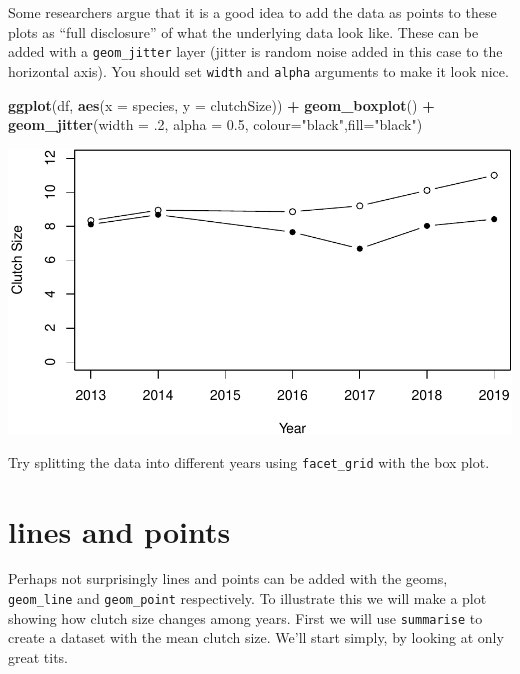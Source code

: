 \documentclass[
  a4paperpaper,
]{book}
\newenvironment{Shaded}{\begin{snugshade}}{\end{snugshade}}
\newcommand{\DataTypeTok}[1]{\textcolor[rgb]{0.13,0.29,0.53}{#1}}
\newcommand{\FloatTok}[1]{\textcolor[rgb]{0.00,0.00,0.81}{#1}}
\newcommand{\KeywordTok}[1]{\textcolor[rgb]{0.13,0.29,0.53}{\textbf{#1}}}
\newcommand{\NormalTok}[1]{#1}
\newcommand{\OperatorTok}[1]{\textcolor[rgb]{0.81,0.36,0.00}{\textbf{#1}}}
\newcommand{\StringTok}[1]{\textcolor[rgb]{0.31,0.60,0.02}{#1}}
\begin{document}
Some researchers argue that it is a good idea to add the data as points to these plots as ``full disclosure'' of what the underlying data look like. These can be added with a \texttt{geom\_jitter} layer (jitter is random noise added in this case to the horizontal axis). You should set \texttt{width} and \texttt{alpha} arguments to make it look nice.

\begin{Shaded}
\begin{Highlighting}[]
\KeywordTok{ggplot}\NormalTok{(df, }\KeywordTok{aes}\NormalTok{(}\DataTypeTok{x =}\NormalTok{ species, }\DataTypeTok{y =}\NormalTok{ clutchSize)) }\OperatorTok{+}
\StringTok{  }\KeywordTok{geom\_boxplot}\NormalTok{() }\OperatorTok{+}\StringTok{ }
\StringTok{  }\KeywordTok{geom\_jitter}\NormalTok{(}\DataTypeTok{width =} \FloatTok{.2}\NormalTok{, }\DataTypeTok{alpha =} \FloatTok{0.5}\NormalTok{, }\DataTypeTok{colour=}\StringTok{"black"}\NormalTok{,}\DataTypeTok{fill=}\StringTok{"black"}\NormalTok{)}
\end{Highlighting}
\end{Shaded}

\includegraphics{BB852_files/figure-latex/unnamed-chunk-80-1.pdf}

Try splitting the data into different years using \texttt{facet\_grid} with the box plot.

\hypertarget{lines-and-points}{%
\section{lines and points}\label{lines-and-points}}

Perhaps not surprisingly lines and points can be added with the geoms, \texttt{geom\_line} and \texttt{geom\_point} respectively.
To illustrate this we will make a plot showing how clutch size changes among years.
First we will use \texttt{summarise} to create a dataset with the mean clutch size. We'll start simply, by looking at only great tits.
\end{document}
